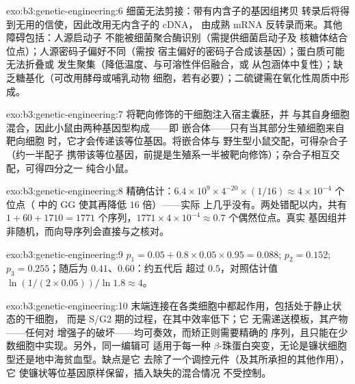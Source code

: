 \begin{solution}{exo:b3:genetic-engineering:6}
细菌无法剪接：带有内含子的基因组拷贝
转录后将得到无用的信使，因此改用无内含子的 cDNA，
由成熟 mRNA 反转录而来。其他障碍包括：人源启动子
不能被细菌聚合酶识别（需提供细菌启动子及
核糖体结合位点）；人源密码子偏好不同（需按
宿主偏好的密码子合成该基因）；蛋白质可能无法折叠或
发生聚集（降低温度、与可溶性伴侣融合，或
从包涵体中复性）；缺乏糖基化（可改用酵母或哺乳动物
细胞，若有必要）；二硫键需在氧化性周质中形成。
\end{solution}

\begin{solution}{exo:b3:genetic-engineering:7}
将靶向修饰的干细胞注入宿主囊胚，并
与其自身细胞混合，因此小鼠由两种基因型构成——即
嵌合体——只有当其部分生殖细胞来自靶向细胞
时，它才会传递该等位基因。将嵌合体与
野生型小鼠交配，可得杂合子（约一半配子
携带该等位基因，前提是生殖系一半被靶向修饰）；杂合子相互交配，可得四分之一
纯合小鼠。
\end{solution}

\begin{solution}{exo:b3:genetic-engineering:8}
精确估计：$6.4\times 10^{9}\times 4^{-20}\times (1/16) \approx 4\times
10^{-4}$ 个位点（ 中的 GG 使其再降低 $16$ 倍）——实际
上几乎没有。两处错配以内，共有 $1 + 60 + 1710 = 1771$
个序列，$1771\times 4\times 10^{-4} \approx 0.7$ 个偶然位点。真实
基因组并非随机，而向导序列会直接与之核对。
\end{solution}

\begin{solution}{exo:b3:genetic-engineering:9}
$p_{1} = 0.05 + 0.8\times 0.05\times 0.95 = 0.088$; $p_{2} = 0.152$;
$p_{3} = 0.255$；随后为 $0.41$、$0.60$：约五代后
超过 $0.5$，对照估计值 $\ln(1/(2\times 0.05))/\ln 1.8 \approx 4$。
\end{solution}

\begin{solution}{exo:b3:genetic-engineering:10}
末端连接在各类细胞中都起作用，包括处于静止状态的干细胞，
而是 S/G2 期的过程，在其中效率低下；它
无需递送模板，其产物——任何对
增强子的破坏——均可奏效，而矫正则需要精确的
序列，且只能在少数细胞中实现。另外，同一编辑可
适用于每一种 $\beta$-珠蛋白突变，无论是镰状细胞型还是地中海贫血型。缺点是它
去除了一个调控元件（及其所承担的其他作用），它
使镰状等位基因原样保留，插入缺失的混合情况
不受控制。
\end{solution}

